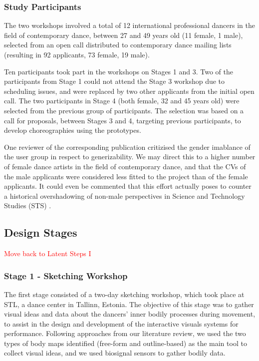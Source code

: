 
\subsubsection{Study Participants}

The two workshops involved a total of 12 international professional dancers in the field of contemporary dance, between 27 and 49 years old (11 female, 1 male), selected from an open call distributed to contemporary dance mailing lists (resulting in 92 applicants, 73 female, 19 male).

Ten participants took part in the workshops on Stages 1 and 3. Two of the participants from Stage 1 could not attend the Stage 3 workshop due to scheduling issues, and were replaced by two other applicants from the initial open call. The two participants in Stage 4 (both female, 32 and 45 years old) were selected from the previous group of participants. The selection was based on a call for proposals, between Stages 3 and 4, targeting previous participants, to develop choreographies using the prototypes.

One reviewer of the corresponding publication critizised the gender imablance of the user group in respect to generizability. We may direct this to a higher number of female dance artists in the field of contemporary dance, and that the CVs of the male applicants were considered less fitted to the project than of the female applicants. It could even be commented that this effort actually poses to counter a historical overshadowing of non-male perspectives in Science and Technology Studies (STS) \cite{wajcman_feminist_2010,hook_soma_2019}.

\subsection{Design Stages}

\textcolor{red}{Move back to Latent Steps I}
\subsubsection{Stage 1 - Sketching Workshop}

The first stage consisted of a two-day sketching workshop, which
took place at STL, a dance center in Tallinn, Estonia. The objective of this stage was to gather visual ideas and data about the dancers’ inner bodily processes during movement, to assist in the design and development of the interactive visuals systems for performance. Following approaches from our literature review, we used the two types of body maps identified (free-form and outline-based) as the main tool to collect visual ideas, and we used biosignal sensors to gather bodily data.


